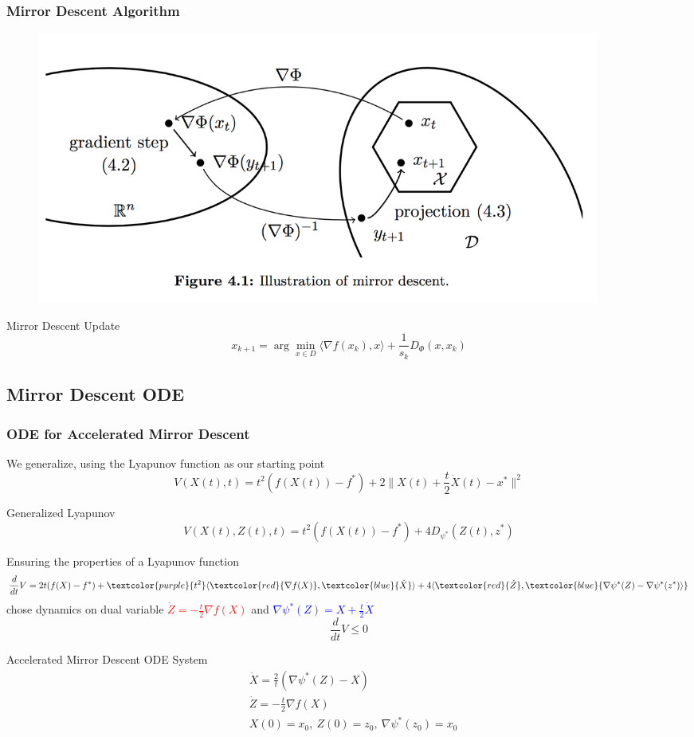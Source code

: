 \documentclass{beamer}
\begin{document}
\begin{frame}
\frametitle{Mirror Descent Algorithm}
\begin{figure}
    \centering
    \includegraphics[width=0.9\textwidth]{Images/mda.png}
\end{figure}
\begin{block}{Mirror Descent Update}
$$x_{k+1} = \arg\min_{x \in D} \langle \nabla f(x_k), x \rangle + \frac{1}{s_k}D_{\Phi}(x,x_k)$$
\end{block}
\end{frame}


\subsection{Mirror Descent ODE}
\begin{frame}
\frametitle{ODE for Accelerated Mirror Descent \cite{krichene2015accelerated}}
We generalize, using the Lyapunov function as our starting point
\[V(X(t),t) = t^2 (f(X(t)) - f^*) +  2 \|X(t)+\frac{t}{2}\dot X(t) - x^* \|^2\]
\begin{block}{Generalized Lyapunov \cite{krichene2015accelerated}}
\[V(X(t),Z(t),t) =t^2(f(X(t)) - f^*) + 4 D_{\psi^*} (Z(t), z^*) \]
\end{block}
 {Ensuring the properties of a Lyapunov function
\[\frac{d}{dt}V = 2 t (f(X) - f^*) + \textcolor{purple}{t^2} \langle \textcolor{red}{\nabla f(X)}, \textcolor{blue}{\dot X}\rangle + 4\langle\textcolor{red}{ \dot Z }, \textcolor{blue}{\nabla \psi^*(Z) - \nabla\psi^*(z^*)\rangle }\]
chose dynamics on dual variable \textcolor{red}{$\dot Z = -\frac{t}{2} \nabla f(X)$} and \textcolor{blue}{$\nabla \psi^*(Z) = X + \frac{t}{2} \dot X$} 
\[\frac{d}{dt}V \leq 0\]}
 {\begin{block}{Accelerated Mirror Descent ODE System \cite{krichene2015accelerated}}\begin{align*}
&\dot X = \frac{2}{t} (\nabla \psi^*(Z) - X)\\
&\dot Z = -\frac{t}{2} \nabla f(X)\\
&X(0) = x_0,~ Z(0) = z_0,~\nabla\psi^*(z_0) = x_0
\end{align*}
\end{block}}
\end{frame}
\end{document}
